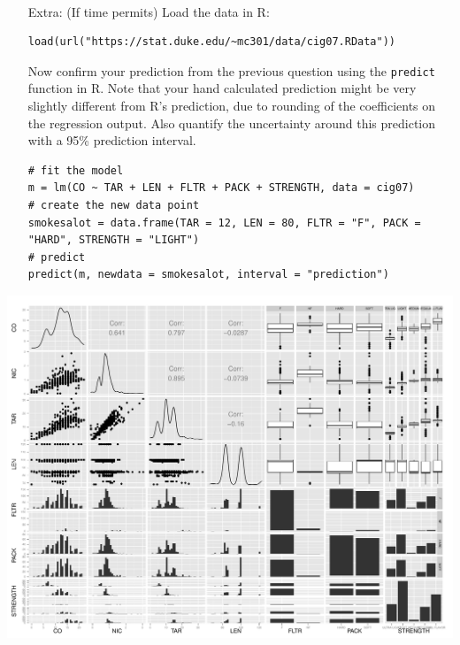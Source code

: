 \documentclass[12pt]{article}
\newcommand{\soln}[2]{$\:$\\ \vspace{#1}}{}
\begin{document}
\begin{enumerate}[resume]
\soln{1.5cm}{
$\widehat{CO} = -0.0586 + 0.7344 * 12 + 0.0267 * 80 + 1.9077 = 12.79$
}

%

\item[Extra:] (If time permits) Load the data in R:

{\small
\begin{Verbatim}[frame=single, formatcom=\color{blue}]
load(url("https://stat.duke.edu/~mc301/data/cig07.RData"))
\end{Verbatim}
}

Now confirm your prediction from the previous question using the \texttt{predict} function in R. Note that your hand 
calculated prediction might be very slightly different from R's prediction, due to rounding of the coefficients on the regression output.
Also quantify the uncertainty around this prediction with a 95\% prediction interval.

{\small
\begin{Verbatim}[frame=single, formatcom=\color{blue}]
# fit the model
m = lm(CO ~ TAR + LEN + FLTR + PACK + STRENGTH, data = cig07)
# create the new data point
smokesalot = data.frame(TAR = 12, LEN = 80, FLTR = "F", PACK = "HARD", STRENGTH = "LIGHT")
# predict
predict(m, newdata = smokesalot, interval = "prediction")
\end{Verbatim}
}

\end{enumerate}


\pagebreak

\begin{landscape}

\begin{center}
\includegraphics[width=1.2\textwidth]{pairs.pdf}
\end{center}

\end{landscape}

%
\end{document}

